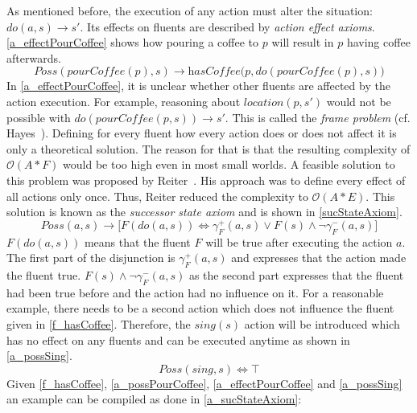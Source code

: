 As mentioned before, the execution of any action must alter the situation: $\textit{do}(a,s) \rightarrow s'$.
Its effects on fluents are described by \emph{action effect axioms}.
\autoref{a_effectPourCoffee} shows how pouring a coffee to $p$ will result in $p$ having coffee afterwards.
\begin{equation}\label{a_effectPourCoffee}
  \textit{Poss}(\textit{pourCoffee}(p),s) \rightarrow \textit{hasCoffee}\big(p,\textit{do}(\textit{pourCoffee}(p),s)\big)
\end{equation}
In \autoref{a_effectPourCoffee}, it is unclear whether other fluents are affected by the action execution.
For example, reasoning about $location(p,s')$ would not be possible with $\textit{do}(\textit{pourCoffee}(p,s)) \rightarrow s'$.
This is called the \emph{frame problem} (cf. Hayes~\cite{hayes_frame_1971}). %
Defining for every fluent how every action does or does not affect it is only a theoretical solution.
The reason for that is that the resulting complexity of $\mathcal{O}(A*F)$ would be too high even in most small worlds.
A feasible solution to this problem was proposed by Reiter~\cite{reiter_frame_1991}.
His approach was to define every effect of all actions only once.
Thus, Reiter reduced the complexity to $\mathcal{O}(A*E)$.
This solution is known as the \emph{successor state axiom} and is shown in \autoref{sucStateAxiom}.
\begin{equation}\label{sucStateAxiom}
  \mathit{Poss}(a,s)\rightarrow \big[\mathit{F}(\mathit{do}(a,s)) \Leftrightarrow\gamma_\mathit{F}^+(a,s)\vee\mathit{F}(s)\wedge\neg\gamma_\mathit{F}^-(a,s)\big]
\end{equation}
$\mathit{F}(\mathit{do}(a,s))$ means that the fluent $F$ will be true after executing the action $a$.
The first part of the disjunction is $\gamma_\mathit{F}^+(a,s)$ and expresses that the action made the fluent true.
$\mathit{F}(s)\wedge\neg\gamma_\mathit{F}^-(a,s)$ as the second part expresses that the fluent had been true before and the action had no influence on it.
For a reasonable example, there needs to be a second action which does not influence the fluent given in \autoref{f_hasCoffee}.
Therefore, the $sing(s)$ action will be introduced which has no effect on any fluents and can be executed anytime as shown in \autoref{a_possSing}.
\begin{equation}\label{a_possSing}
  \mathit{Poss}(\mathit{sing}, s) \Leftrightarrow \top
\end{equation}
Given \autoref{f_hasCoffee}, \ref{a_possPourCoffee}, \ref{a_effectPourCoffee} and \ref{a_possSing} an example can be compiled as done in \autoref{a_sucStateAxiom}:
